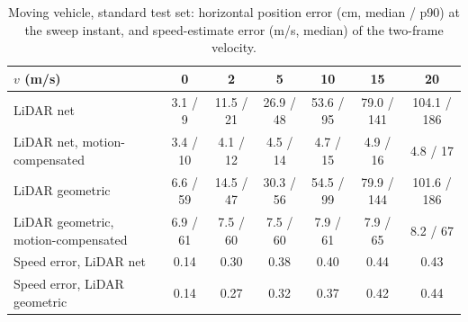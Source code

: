 \begin{table}[t]\centering\caption{Moving vehicle, standard test set: horizontal position error (cm, median / p90) at the sweep instant, and speed-estimate error (m/s, median) of the two-frame velocity.}\label{tab:motion_poserr}
\small\begin{tabular}{@{}lcccccc@{}}\toprule
$v$ (m/s) & 0 & 2 & 5 & 10 & 15 & 20 \\\midrule
LiDAR net & 3.1 / 9 & 11.5 / 21 & 26.9 / 48 & 53.6 / 95 & 79.0 / 141 & 104.1 / 186 \\
LiDAR net, motion-compensated & 3.4 / 10 & 4.1 / 12 & 4.5 / 14 & 4.7 / 15 & 4.9 / 16 & 4.8 / 17 \\
LiDAR geometric & 6.6 / 59 & 14.5 / 47 & 30.3 / 56 & 54.5 / 99 & 79.9 / 144 & 101.6 / 186 \\
LiDAR geometric, motion-compensated & 6.9 / 61 & 7.5 / 60 & 7.5 / 60 & 7.9 / 61 & 7.9 / 65 & 8.2 / 67 \\
\midrule
Speed error, LiDAR net & 0.14 & 0.30 & 0.38 & 0.40 & 0.44 & 0.43 \\
Speed error, LiDAR geometric & 0.14 & 0.27 & 0.32 & 0.37 & 0.42 & 0.44 \\
\bottomrule\end{tabular}\end{table}
